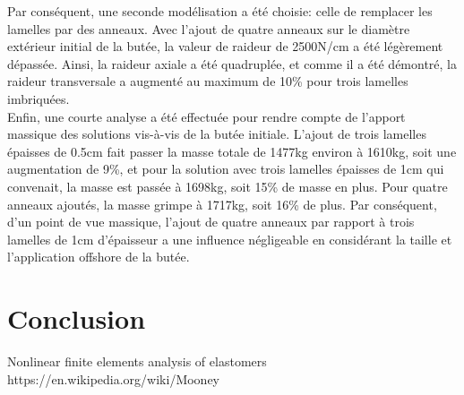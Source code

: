 ﻿\documentclass{article}
\begin{document}
Par conséquent, une seconde modélisation a été choisie: celle de remplacer les lamelles par des anneaux. Avec l'ajout de quatre anneaux sur le diamètre extérieur initial de la butée, la valeur de raideur de 2500N/cm a été légèrement dépassée. Ainsi, la raideur axiale a été quadruplée, et comme il a été démontré, la raideur transversale a augmenté au maximum de 10\% pour trois lamelles imbriquées.
\\

Enfin, une courte analyse a été effectuée pour rendre compte de l'apport massique des solutions vis-à-vis de la butée initiale. L'ajout de trois lamelles épaisses de 0.5cm fait passer la masse totale de 1477kg environ à 1610kg, soit une augmentation de 9\%, et pour la solution avec trois lamelles épaisses de 1cm qui convenait, la masse est passée à 1698kg, soit 15\% de masse en plus. Pour quatre anneaux ajoutés, la masse grimpe à 1717kg, soit 16\% de plus. Par conséquent, d'un point de vue massique, l'ajout de quatre anneaux par rapport à trois lamelles de 1cm d'épaisseur a une influence négligeable en considérant la taille et l'application offshore de la butée.

\section{Conclusion}

\listoffigures

\begin{thebibliography}{9}
 Nonlinear finite elements analysis of elastomers
 https://en.wikipedia.org/wiki/Mooney%
\end{thebibliography}
\end{document}
